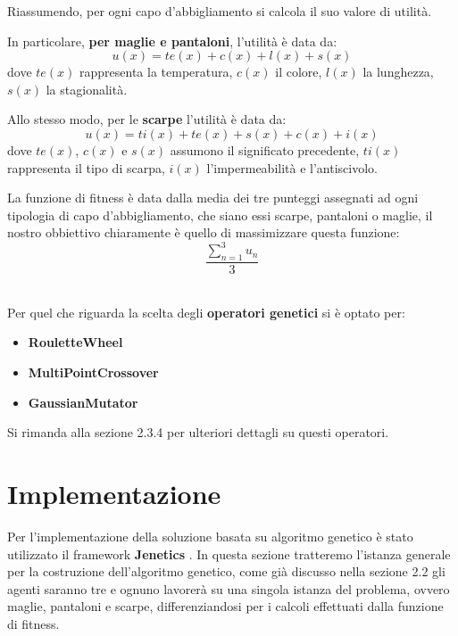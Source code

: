 \documentclass[a4paper, 11pt, oneside]{report}
\begin{document}
            \newpage
            \par \noindent Riassumendo, per ogni capo d'abbigliamento si calcola il suo valore di utilità.
            \\
            \par \noindent In particolare, \textbf{per maglie e pantaloni}, l'utilità è data da:
            \[
                u(x)=te(x)+c(x)+l(x)+s(x)
            \]
            dove $te(x)$ rappresenta la temperatura, $c(x)$ il colore, $l(x)$ la lunghezza, $s(x)$ la stagionalità.
            \\
            \par \noindent Allo stesso modo, per le \textbf{scarpe} l'utilità è data da:
            \[
                u(x)=ti(x)+te(x)+s(x)+c(x)+i(x)
            \]
            dove $te(x)$, $c(x)$ e $s(x)$ assumono il significato precedente, $ti(x)$ rappresenta il tipo di scarpa,
            $i(x)$ l'impermeabilità e l'antiscivolo.
            \\
            \par \noindent La funzione di fitness è data dalla media dei tre punteggi assegnati
            ad ogni tipologia di capo d'abbigliamento, che siano essi scarpe, pantaloni o maglie, il nostro obbiettivo
            chiaramente è quello di massimizzare questa funzione:
            \[
                \frac{\sum_{n=1}^{3} u_{n}}{3}
            \]
            \\
            \par \noindent Per quel che riguarda la scelta degli \textbf{operatori genetici} si è optato per:
            \begin{itemize}
                \item \textbf{RouletteWheel}
                \item \textbf{MultiPointCrossover}
                \item \textbf{GaussianMutator}
            \end{itemize}
            Si rimanda alla sezione 2.3.4 per ulteriori dettagli su questi operatori.

            \newpage
            \section{Implementazione}
            Per l'implementazione della soluzione basata su algoritmo genetico è stato utilizzato il framework
            \textbf{Jenetics} \cite{1}. In questa sezione tratteremo l'istanza generale per la costruzione dell'algoritmo
            genetico, come già discusso nella sezione 2.2 gli agenti saranno tre e ognuno lavorerà su una singola istanza
            del problema, ovvero maglie, pantaloni e scarpe, differenziandosi per i calcoli effettuati dalla funzione di
            fitness.
\end{document}
